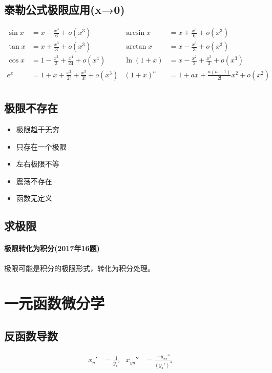 ﻿\documentclass[a4paper,12pt,UTF8]{ctexart}
\begin{document}
    \subsection{泰勒公式极限应用(x→0)}
    \begin{align*}
        \sin x& = x - \frac{x^{3}}{6} + o(x^{3})& \arcsin x& = x + \frac{x^{3}}{6} + o(x^{3})&\\
        \tan x& = x + \frac{x^{3}}{3} + o(x^{3})& \arctan x& = x - \frac{x^{3}}{3} + o(x^{3})&\\
        \cos x& = 1 - \frac{x^{2}}{2} + \frac{x^{4}}{24} + o(x^{4})& \ln (1+x)& = x - \frac{x^{2}}{2} + \frac{x^{3}}{3} + o(x^{3})&\\
        e^x& = 1 + x + \frac{x^{2}}{2!} + \frac{x^{3}}{3!} + o(x^{3})& (1+x)^{a}& = 1 + ax + \frac{a(a-1)}{2!}x^{2} + o(x^{2})&\\
    \end{align*}

    \subsection{极限不存在}
    \begin{itemize}
        \item 极限趋于无穷
        \item 只存在一个极限
        \item 左右极限不等
        \item 震荡不存在
        \item 函数无定义
    \end{itemize}

    \subsection{求极限}

    \paragraph{极限转化为积分(2017年16题)} 极限可能是积分的极限形式，转化为积分处理。

    \section{一元函数微分学}

    \subsection{反函数导数}
    \begin{align*}
        x_y'& = \frac{1}{y_x'}& x_{yy}''& = \frac{-y_{xx}''}{(y_x')^{3}}&\\
    \end{align*}
\end{document}
